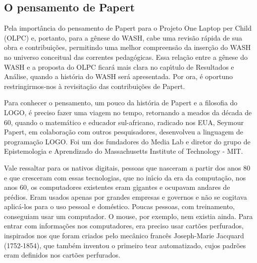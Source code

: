 \documentclass[
12pt,		%
openright,	%
twoside,  %
a4paper,			%
chapter=TITLE,		%
english,			%
french,				%
spanish,			%
brazil				%
]{USPSC-classe/USPSC}
\begin{document}
\subsection[O pensamento de Papert]{O pensamento de Papert}\label{O pensamento de Papert}
Pela import\^ancia do pensamento de Papert para o Projeto One Laptop per Child (OLPC) e, portanto, para a g\^enese do WASH, cabe uma revis\~ao r\'apida de sua obra e contribui\c{c}\~oes, permitindo uma melhor compreens\~ao da inser\c{c}\~ao do WASH no universo conceitual das correntes pedag\'ogicas. Essa rela\c{c}\~ao entre a g\^enese do WASH e a proposta do OLPC ficar\'a mais clara no cap\'{\i}tulo de Resultados e An\'alise, quando a hist\'oria do WASH ser\'a apresentada. Por ora, \'e oportuno restringirmos-nos \`a revisita\c{c}\~ao das contribui\c{c}\~oes de Papert.









Para conhecer  o pensamento, um pouco da hist\'oria de Papert e  a filosofia do LOGO, \'e preciso fazer uma viagem no tempo, retornando a meados da d\'ecada de 60, quando o matem\'atico e educador sul-africano, radicado nos EUA, Seymour Papert, em colabora\c{c}\~ao com outros pesquisadores, desenvolveu a linguagem  de programa\c{c}\~ao LOGO.  Foi um dos fundadores do Media Lab e diretor do grupo de Epistemologia e Aprendizado do Massachusetts Institute of Technology - MIT.









Vale ressaltar para os nativos digitais, pessoas que nasceram a partir dos anos 80 e que cresceram com essas tecnologias, que no in\'{\i}cio da era da computa\c{c}\~ao, nos anos 60, os computadores existentes eram gigantes e ocupavam andares de pr\'edios. Eram usados apenas por grandes empresas e governos e n\~ao se cogitava aplic\'a-los para o uso pessoal e dom\'estico. Poucas pessoas, com treinamento, conseguiam usar um computador. O mouse, por exemplo, nem existia ainda. Para entrar com informa\c{c}\~oes nos computadores, era preciso usar cart\~oes perfurados, inspirados nos que foram criados pelo mec\^anico franc\^es Joseph-Marie Jacquard (1752-1854), que tamb\'em inventou o primeiro tear automatizado, cujos padr\~oes eram definidos nos cart\~oes perfurados.
\end{document}
